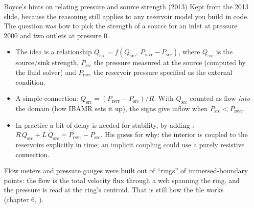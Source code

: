 \documentclass[aspectratio=169,11pt]{beamer}
\begin{document}
\begin{frame}{Boyce's hints on relating pressure and source strength (2013)}
\label{fr:boyce}
\small Kept from the 2013 slide, because the reasoning still applies to any reservoir model you build in code. The question was how to pick the strength of a source for an inlet at pressure 2000 and two outlets at pressure 0.
\begin{itemize}
  \item The idea is a relationship $Q_{\mathrm{src}} = f(Q_{\mathrm{src}},\,P_{\mathrm{rsvr}} - P_{\mathrm{src}})$, where $Q_{\mathrm{src}}$ is the source/sink strength, $P_{\mathrm{src}}$ the pressure measured at the source (computed by the fluid solver) and $P_{\mathrm{rsvr}}$ the reservoir pressure specified as the external condition.
  \item A simple  connection: $Q_{\mathrm{src}} = (P_{\mathrm{rsvr}} - P_{\mathrm{src}})/R$. With $Q_{\mathrm{src}}$ counted as flow \emph{into} the domain (how IBAMR sets it up), the signs give inflow when $P_{\mathrm{src}} < P_{\mathrm{rsvr}}$.
  \item In practice a bit of delay is needed for stability, by adding : $R\,Q_{\mathrm{src}} + L\,\dot{Q}_{\mathrm{src}} = P_{\mathrm{rsvr}} - P_{\mathrm{src}}$. His guess for why: the interior is coupled to the reservoirs explicitly in time; an implicit coupling could use a purely resistive connection.
\end{itemize}
\vspace{1mm}
\small Flow meters and pressure gauges were built out of ``rings'' of immersed-boundary points: the flow is the total velocity flux through a web spanning the ring, and the pressure is read at the ring's centroid. That is still how the  file works (chapter 6, ).
\end{frame}
\end{document}
